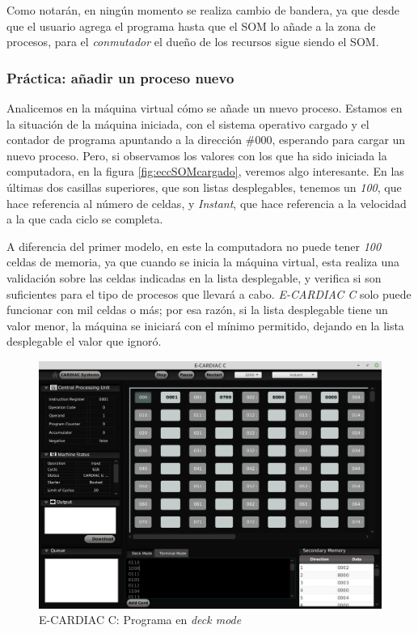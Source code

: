 \documentclass[letterpaper,12pt,oneside]{book}
\begin{document}
	        Como notarán, en ningún momento se realiza cambio de bandera, ya que desde que el usuario agrega el programa hasta que
			el SOM lo añade a la zona de procesos, para el \textit{conmutador} el dueño de los recursos sigue siendo el SOM.
			
			
		
		\subsubsection{Práctica: añadir un proceso nuevo }		
		
			Analicemos en la máquina virtual cómo se añade un nuevo proceso. Estamos en la situación
			de la máquina iniciada, con el sistema operativo cargado y el contador de programa apuntando a  la dirección \#000,
			esperando para cargar un nuevo proceso. Pero, si observamos los valores con los que ha sido iniciada la computadora,
			en la figura \ref{fig:eccSOMcargado}, veremos algo interesante. En las últimas dos casillas superiores, que
			son listas desplegables, tenemos un \textit{100}, que hace referencia al número de celdas, y \textit{Instant}, que hace 
			referencia a la velocidad a la que cada ciclo se completa.
			
			A diferencia del primer modelo, en este la computadora no puede tener 
			\textit{100} 
			celdas de memoria, ya que cuando se inicia la máquina virtual,
			esta realiza una validación sobre las celdas indicadas en la lista desplegable, y verifica si son suficientes para el tipo de procesos que 
			llevará 
			a cabo. 
			\textit{E-CARDIAC C}
			solo puede funcionar con mil celdas o más; por esa razón, si la lista desplegable tiene un valor menor, la
			máquina se iniciará con el mínimo permitido, dejando en la lista desplegable el valor que ignoró.

        \begin{figure}[h]		
			\centering
			\includegraphics[scale=0.54]{media/CARDIACC/cardiaccProgramaEnDeck.png}
			\caption{E-CARDIAC C: Programa en \textit{deck mode}}
			\label{fig:eccProgramaenDeck}
		\end{figure}		
   
\end{document}
